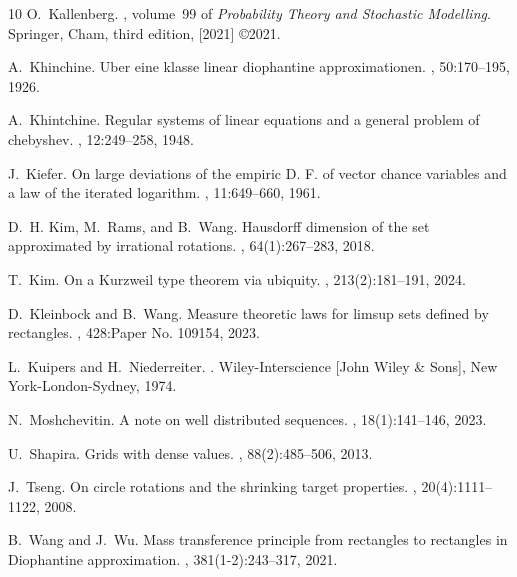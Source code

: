\documentclass{amsart}
\theoremstyle{definition}
\newcommand{\0}{\mbf 0}%
\begin{document}
\begin{thebibliography}{10}
O.~Kallenberg.
, volume~99 of {\em
  Probability Theory and Stochastic Modelling}.
\newblock Springer, Cham, third edition, [2021] \copyright 2021.

A.~Khinchine.
\newblock Uber eine klasse linear diophantine approximationen.
, 50:170--195, 1926.

A.~Khintchine.
\newblock Regular systems of linear equations and a general problem of
  chebyshev.
, 12:249--258, 1948.

J.~Kiefer.
\newblock On large deviations of the empiric {D}. {F}. of vector chance
  variables and a law of the iterated logarithm.
, 11:649--660, 1961.

D.~H. Kim, M.~Rams, and B.~Wang.
\newblock Hausdorff dimension of the set approximated by irrational rotations.
, 64(1):267--283, 2018.

T.~Kim.
\newblock On a {K}urzweil type theorem via ubiquity.
, 213(2):181--191, 2024.

D.~Kleinbock and B.~Wang.
\newblock Measure theoretic laws for limsup sets defined by rectangles.
, 428:Paper No. 109154, 2023.

L.~Kuipers and H.~Niederreiter.
.
\newblock Wiley-Interscience [John Wiley \& Sons], New York-London-Sydney,
  1974.

N.~Moshchevitin.
\newblock A note on well distributed sequences.
, 18(1):141--146, 2023.

U.~Shapira.
\newblock Grids with dense values.
, 88(2):485--506, 2013.

J.~Tseng.
\newblock On circle rotations and the shrinking target properties.
, 20(4):1111--1122, 2008.

B.~Wang and J.~Wu.
\newblock Mass transference principle from rectangles to rectangles in
  {D}iophantine approximation.
, 381(1-2):243--317, 2021.

\end{thebibliography}
\end{document}

